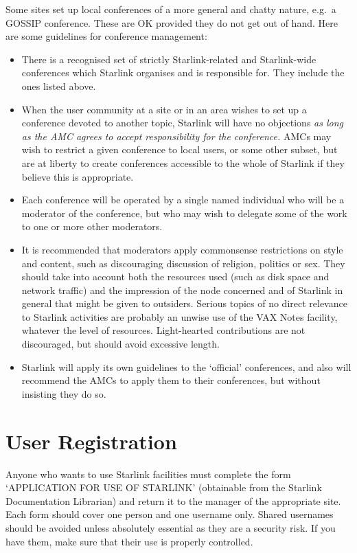 Some sites set up local conferences of a more general and chatty nature, e.g.\
a GOSSIP conference.
These are OK provided they do not get out of hand.
Here are some guidelines for conference management:
\begin{itemize}
\item There is a recognised set of strictly Starlink-related and Starlink-wide
conferences which Starlink organises and is responsible for.
They include the ones listed above.
\item When the user community at a site or in an area wishes to set up a
conference devoted to another topic, Starlink will have no objections {\em as
long as the AMC agrees to accept responsibility for the conference.}
AMCs may wish to restrict a given conference to local users, or some other
subset, but are at liberty to create conferences accessible to the whole of
Starlink if they believe this is appropriate.
\item Each conference will be operated by a single named individual who will
be a moderator of the conference, but who may wish to delegate some of the
work to one or more other moderators.
\item It is recommended that moderators apply commonsense restrictions on
style and content, such as discouraging discussion of religion, politics or sex.
They should take into account both the resources used (such as disk space and
network traffic) and the impression of the node concerned and of Starlink in
general that might be given to outsiders.
Serious topics of no direct relevance to Starlink activities are probably an
unwise use of the VAX Notes facility, whatever the level of resources.
Light-hearted contributions are not discouraged, but should avoid excessive
length.
\item Starlink will apply its own guidelines to the `official' conferences,
and also will recommend the AMCs to apply them to their conferences, but
without insisting they do so.
\end{itemize}

\section {User Registration}

Anyone who wants to use Starlink facilities must complete the form `APPLICATION
FOR USE OF STARLINK' (obtainable from the Starlink Documentation Librarian) and
return it to the manager of the appropriate site.
Each form should cover one person and one username only.
Shared usernames should be avoided unless absolutely essential as they are a
security risk.
If you have them, make sure that their use is properly controlled.
 
